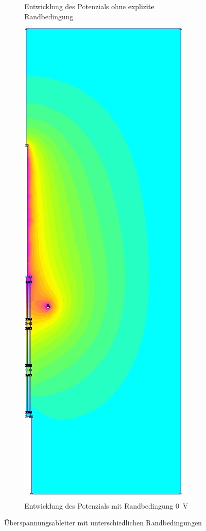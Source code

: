 \begin{figure}[h!]
\begin{subfigure}[h]{.35\textwidth}
		\caption{Entwicklung des Potenzials ohne explizite Randbedingung}
		\label{fig:KeinRand}
		\vspace{-2pt}
	\end{subfigure}
	\begin{subfigure}[h]{.34\textwidth}
		\centering
		\includegraphics[width=\textwidth]{data/0VBoundary}
		\caption{Entwicklung des Potenzials mit Randbedingung \SI{0}{\volt}}
		\label{fig:0VRand}
	\end{subfigure}
	\caption{Überspannungsableiter mit unterschiedlichen Randbedingungen}
	\label{fig:Alle}
\end{figure}
